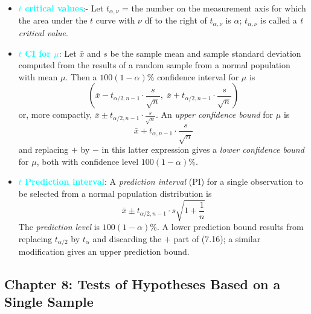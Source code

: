 \documentclass{report}
\begin{document}
\begin{itemize}
    \item \textbf{\textcolor{cyan}{$t$ critical values}}:-
        Let $t_{\alpha, \nu}$ = the number on the measurement axis for which the area under the $t$ curve with $\nu$ df to the right of $t_{\alpha, \nu}$ is $\alpha$; $t_{\alpha, \nu}$ is called a \textit{t critical value}.
    \item \textbf{\textcolor{cyan}{$t$ CI for $\mu$}}:
        Let $\bar{x}$ and $s$ be the sample mean and sample standard deviation computed from the results of a random sample from a normal population with mean $\mu$. Then a $100(1 - \alpha)\%$ confidence interval for $\mu$ is
        \[
            \left( \bar{x} - t_{\alpha/2, n-1} \cdot \frac{s}{\sqrt{n}}, \; \bar{x} + t_{\alpha/2, n-1} \cdot \frac{s}{\sqrt{n}} \right) \tag{7.15}
        \]
        or, more compactly, $\bar{x} \pm t_{\alpha/2, n-1} \cdot \frac{s}{\sqrt{n}}$.
        \bigbreak \noindent 
        An \textit{upper confidence bound} for $\mu$ is
        \[
            \bar{x} + t_{\alpha, n-1} \cdot \frac{s}{\sqrt{n}}
        \]
        and replacing $+$ by $-$ in this latter expression gives a \textit{lower confidence bound} for $\mu$, both with confidence level $100(1 - \alpha)\%$.
    \item \textbf{\textcolor{cyan}{$t$ Prediction interval}}:
        A \textit{prediction interval} (PI) for a single observation to be selected from a normal population distribution is
        \[
            \bar{x} \pm t_{\alpha/2, n-1} \cdot s \sqrt{1 + \frac{1}{n}} \tag{7.16}
        \]
        The \textit{prediction level} is $100(1 - \alpha)\%$. A lower prediction bound results from replacing $t_{\alpha/2}$ by $t_{\alpha}$ and discarding the $+$ part of (7.16); a similar modification gives an upper prediction bound.
    \end{itemize}


    \pagebreak 
    \subsection{Chapter 8: Tests of Hypotheses Based on a Single Sample}
    \bigbreak \noindent 
\end{document}

